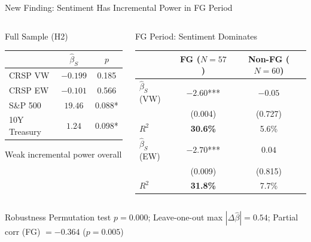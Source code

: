 \documentclass[aspectratio=169, 11pt]{beamer}
\begin{document}
\begin{frame}{New Finding: Sentiment Has Incremental Power in FG Period}
\begin{columns}[T]
\begin{ablock}{Full Sample (H2)}
{\small
\begin{tabular}{lcc}
\toprule
 & $\hat{\beta}_S$ & $p$ \\
\midrule
CRSP VW & $-0.199$ & 0.185 \\
CRSP EW & $-0.101$ & 0.566 \\
S\&P 500 & $19.46$ & 0.088* \\
10Y Treasury & $1.24$ & 0.098* \\
\bottomrule
\end{tabular}
}
\vspace{0.3em}
{\small Weak incremental power overall}
\end{ablock}

\begin{aalertblock}{FG Period: Sentiment Dominates}
{\small
\begin{tabular}{lcc}
\toprule
 & FG ($N\!=\!57$) & Non-FG ($N\!=\!60$) \\
\midrule
$\hat{\beta}_S$ (VW) & $-2.60$*** & $-0.05$ \\
 & (0.004) & (0.727) \\
$R^2$ & \textbf{30.6\%} & 5.6\% \\
\midrule
$\hat{\beta}_S$ (EW) & $-2.70$*** & $0.04$ \\
 & (0.009) & (0.815) \\
$R^2$ & \textbf{31.8\%} & 7.7\% \\
\bottomrule
\end{tabular}
}
\end{aalertblock}
\end{columns}

\vspace{0.3em}
\begin{aexampleblock}{Robustness}
Permutation test $p = 0.000$; Leave-one-out max $|\Delta\hat{\beta}| = 0.54$; Partial corr (FG) $= -0.364$ ($p = 0.005$)
\end{aexampleblock}
\end{frame}
\end{document}
